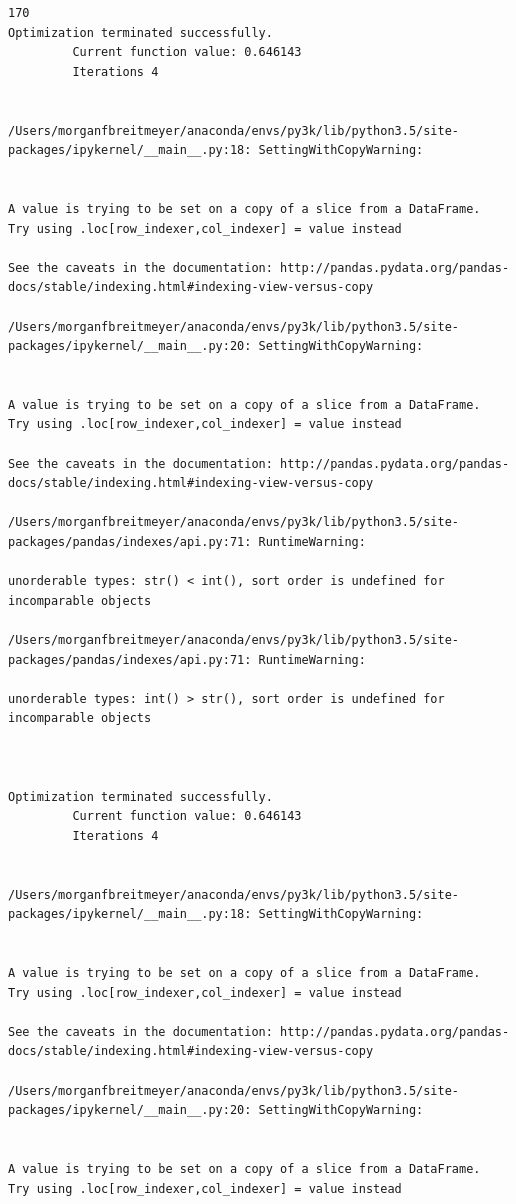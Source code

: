 \begin{lstlisting}
170
Optimization terminated successfully.
         Current function value: 0.646143
         Iterations 4


/Users/morganfbreitmeyer/anaconda/envs/py3k/lib/python3.5/site-packages/ipykernel/__main__.py:18: SettingWithCopyWarning:


A value is trying to be set on a copy of a slice from a DataFrame.
Try using .loc[row_indexer,col_indexer] = value instead

See the caveats in the documentation: http://pandas.pydata.org/pandas-docs/stable/indexing.html#indexing-view-versus-copy

/Users/morganfbreitmeyer/anaconda/envs/py3k/lib/python3.5/site-packages/ipykernel/__main__.py:20: SettingWithCopyWarning:


A value is trying to be set on a copy of a slice from a DataFrame.
Try using .loc[row_indexer,col_indexer] = value instead

See the caveats in the documentation: http://pandas.pydata.org/pandas-docs/stable/indexing.html#indexing-view-versus-copy

/Users/morganfbreitmeyer/anaconda/envs/py3k/lib/python3.5/site-packages/pandas/indexes/api.py:71: RuntimeWarning:

unorderable types: str() < int(), sort order is undefined for incomparable objects

/Users/morganfbreitmeyer/anaconda/envs/py3k/lib/python3.5/site-packages/pandas/indexes/api.py:71: RuntimeWarning:

unorderable types: int() > str(), sort order is undefined for incomparable objects



Optimization terminated successfully.
         Current function value: 0.646143
         Iterations 4


/Users/morganfbreitmeyer/anaconda/envs/py3k/lib/python3.5/site-packages/ipykernel/__main__.py:18: SettingWithCopyWarning:


A value is trying to be set on a copy of a slice from a DataFrame.
Try using .loc[row_indexer,col_indexer] = value instead

See the caveats in the documentation: http://pandas.pydata.org/pandas-docs/stable/indexing.html#indexing-view-versus-copy

/Users/morganfbreitmeyer/anaconda/envs/py3k/lib/python3.5/site-packages/ipykernel/__main__.py:20: SettingWithCopyWarning:


A value is trying to be set on a copy of a slice from a DataFrame.
Try using .loc[row_indexer,col_indexer] = value instead


\end{lstlisting}
